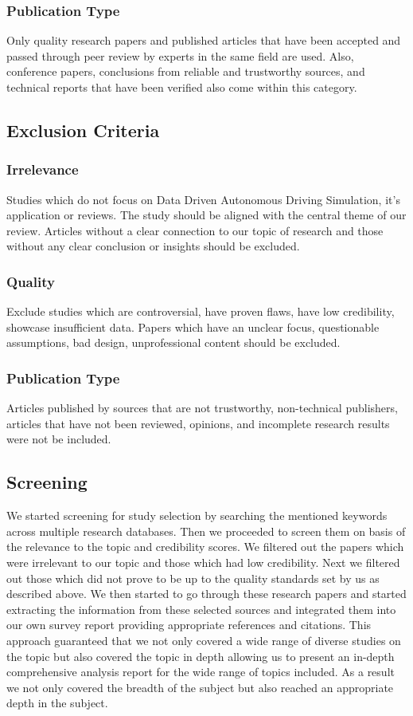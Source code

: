 \documentclass[lettersize,journal]{IEEEtran}
\begin{document}
\subsubsection{Publication Type}
Only quality research papers and published articles that have been accepted and passed through peer review by experts in the same field are used. Also, conference papers, conclusions from reliable and trustworthy sources, and technical reports that have been verified also come within this category.

\subsection{Exclusion Criteria}
\subsubsection{Irrelevance}
Studies which do not focus on Data Driven Autonomous Driving Simulation, it's application or reviews. The study should be aligned with the central theme of our review. Articles without a clear connection to our topic of research and those without any clear conclusion or insights should be excluded.

\subsubsection{Quality}
Exclude studies which are controversial, have proven flaws, have low credibility, showcase insufficient data. Papers which have an unclear focus, questionable assumptions, bad design, unprofessional content should be excluded.

\subsubsection{Publication Type}
Articles published by sources that are not trustworthy, non-technical publishers, articles that have not been reviewed, opinions, and incomplete research results were not be included.

\subsection{Screening}
We started screening for study selection by searching the mentioned keywords across multiple research databases.
Then we proceeded to screen them on basis of the relevance to the topic and credibility scores. We filtered out 
the papers which were irrelevant to our topic and those which had low credibility. Next we filtered out those which
did not prove to be up to the quality standards set by us as described above. We then started to go through these 
research papers and started extracting the information from these selected sources and integrated them into our own
survey report providing appropriate references and citations.
This approach guaranteed that we not only covered a wide range of diverse studies on the topic but also covered the
topic in depth allowing us to present an in-depth comprehensive analysis report for the wide range of topics included.
As a result we not only covered the breadth of the subject but also reached an appropriate depth in the subject.
\end{document}
